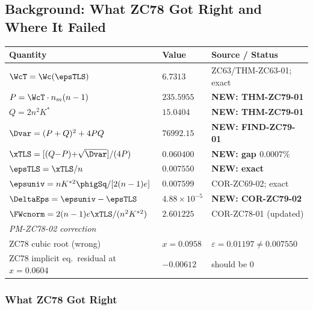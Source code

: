 \documentclass[12pt, a4paper]{article}
\begin{document}
\subsection{Background: What ZC78 Got Right and Where It Failed}
\label{sec:background}

\begin{keybox}[title={Numerical Summary --- ZC79 (T-canonical)}]
{\small\renewcommand{\arraystretch}{1.25}
\begin{center}
\begin{tabular}{@{}p{5.2cm}p{2.4cm}p{4.4cm}@{}}
\toprule
\textbf{Quantity} & \textbf{Value} & \textbf{Source / Status} \\
\midrule
$\WcT = \Wc(\epsTLS)$           & $6.7313$   & ZC63/THM-ZC63-01; exact \\
$P = \WcT\cdot n_m(n-1)$        & $235.5955$ & \textbf{NEW: THM-ZC79-01} \\
$Q = 2n^2 K^*$                  & $15.0404$  & \textbf{NEW: THM-ZC79-01} \\
$\Dvar = (P+Q)^2+4PQ$           & $76992.15$ & \textbf{NEW: FIND-ZC79-01} \\
$\xTLS = [(Q{-}P){+}\sqrt{\Dvar}]/(4P)$  & $0.060400$ & \textbf{NEW: gap $0.0007\%$} \\
$\epsTLS = \xTLS/n$             & $0.007550$ & \textbf{NEW: exact} \\
$\epsuniv = nK^{*2}\phigSq/[2(n-1)e]$ & $0.007599$ & COR-ZC69-02; exact \\
$\DeltaEps = \epsuniv - \epsTLS$ & $4.88\times10^{-5}$ & \textbf{NEW: COR-ZC79-02} \\
$\FWcnorm = 2(n-1)e\xTLS/(n^2K^{*2})$ & $2.601225$ & COR-ZC78-01 (updated) \\
\midrule
\textit{PM-ZC78-02 correction}  & & \\
ZC78 cubic root (wrong)         & $x = 0.0958$ & $\varepsilon = 0.01197 \neq 0.007550$ \\
ZC78 implicit eq.\ residual at $x=0.0604$ & $-0.00612$ & should be $0$ \\
\bottomrule
\end{tabular}
\end{center}}
\end{keybox}

\subsubsection{What ZC78 Got Right}
\end{document}
